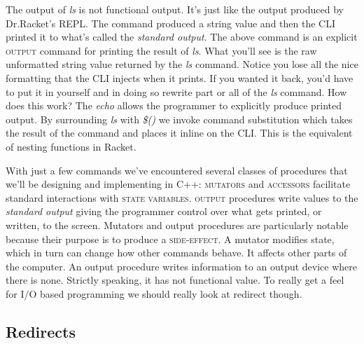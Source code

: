 \documentclass[]{tufte-handout}
\begin{document}
\begin{enumerate}
The output of \textit{ls} is not functional output. It's just like the output produced by Dr.Racket's REPL. The command produced a string value and then the CLI printed it to what's called the \textit{standard output}. The above command is an explicit \textsc{output} command for printing the result of \textit{ls}. What you'll see is the raw unformatted string value returned by the \textit{ls} command. Notice you lose all the nice formatting that the CLI injects when it prints. If you wanted it back, you'd have to put it in yourself and in doing so rewrite part or all of the \textit{ls} command. How does this work? The \textit{echo} allows the programmer to explicitly produce printed output. By surrounding \textit{ls} with \textit{\$()} we invoke command substitution which takes the result of the command and places it inline on the CLI. This is the equivalent of nesting functions in Racket. 

\end{enumerate}

With just a few commands we've encountered several classes of procedures that we'll be designing and implementing in C++: \textsc{mutators} and \textsc{accessors} facilitate standard interactions with \textsc{state variables}. \textsc{output} procedures write values to the \textit{standard output} giving the programmer control over what gets printed, or written, to the screen. Mutators and output procedures are particularly notable because their purpose is to produce a \textsc{side-effect}. A mutator modifies state, which in turn can change how other commands behave. It affects other parts of the computer. An output procedure writes information to an output device where there is none. Strictly speaking, it has not functional value.  To really get a feel for I/O based programming we should really look at redirect though. 

\subsection{Redirects}
\end{document}
